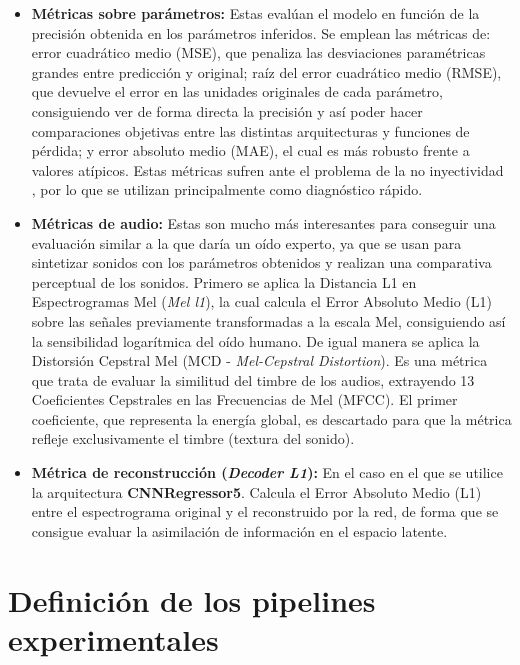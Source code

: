 \begin{itemize}

\item \textbf{Métricas sobre parámetros: } Estas evalúan el modelo en función de la precisión obtenida
en los parámetros inferidos. Se emplean las métricas de: error cuadrático medio (MSE), que penaliza las desviaciones paramétricas grandes 
entre predicción y original; raíz del error cuadrático medio (RMSE), que devuelve el error en las unidades originales de cada parámetro, consiguiendo
ver de forma directa la precisión y así poder hacer comparaciones objetivas entre las distintas arquitecturas y funciones de pérdida;
y error absoluto medio (MAE), el cual es más robusto frente a valores atípicos. Estas métricas sufren ante el problema de la no inyectividad 
, por lo que se utilizan principalmente como diagnóstico rápido.

\item \textbf{Métricas de audio: } Estas son mucho más interesantes para conseguir una evaluación
similar a la que daría un oído experto, ya que se usan para sintetizar sonidos con los parámetros obtenidos y realizan una comparativa
perceptual de los sonidos. Primero se aplica la Distancia L1 en Espectrogramas Mel (\textit{Mel l1}), la cual calcula el 
Error Absoluto Medio (L1) sobre las señales previamente transformadas a la escala Mel, consiguiendo así la sensibilidad logarítmica
del oído humano. De igual manera se aplica la Distorsión Cepstral Mel (MCD - \textit{Mel-Cepstral Distortion}). Es una métrica que trata 
de evaluar la similitud del timbre de los audios, extrayendo 13 Coeficientes Cepstrales en las Frecuencias de Mel (MFCC). 
El primer coeficiente, que representa la energía global, es descartado para que la métrica refleje exclusivamente el timbre (textura del sonido).

\item \textbf{Métrica de reconstrucción (\textit{Decoder L1}): } En el caso en el que se utilice la arquitectura
\textbf{CNNRegressor5}. Calcula el Error Absoluto Medio (L1) entre el espectrograma original y el reconstruido por la red,
de forma que se consigue evaluar la asimilación de información en el espacio latente. 

\end{itemize} 

\section{Definición de los pipelines experimentales}


